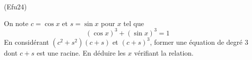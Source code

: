 \begin{tiny}(Efu24)\end{tiny} On note $c = \cos x$ et $s=\sin x$ pour $x$ tel que
\begin{displaymath}
(\cos x)^3 + (\sin x)^3 = 1  
\end{displaymath}
En considérant $(c^2+s^2)(c+s)$ et $(c+s)^3$, former une équation de degré $3$ dont $c+s$ est une racine. En déduire les $x$ vérifiant la relation.
